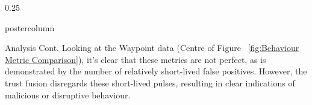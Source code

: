 \documentclass[final,hyperref={pdfpagelabels=false}]{beamer}
\newlength{\columnheight}
\def\colwidth{0.25\linewidth}
\begin{document}
\begin{frame}[fragile]
\begin{columns}[t]
    \begin{column}{\colwidth}
      \begin{beamercolorbox}[center,wd=\textwidth]{postercolumn}
        \begin{minipage}[T]{.98\textwidth} %
          \parbox[t][\columnheight]{\textwidth}{ %


            \begin{block}{Analysis Cont.}
              Looking at the Waypoint data (Centre of Figure ~\ref{fig:Behaviour Metric Comparison}), it's clear that these metrics are not perfect, as is demonstrated by the number of relatively short-lived false positives. However, the trust fusion disregards these short-lived pulses, resulting in clear indications of malicious or disruptive behaviour.

              \vspace{\baselineskip}


\end{block}}
\end{minipage}
\end{beamercolorbox}
\end{column}
\end{columns}
\end{frame}
\end{document}

